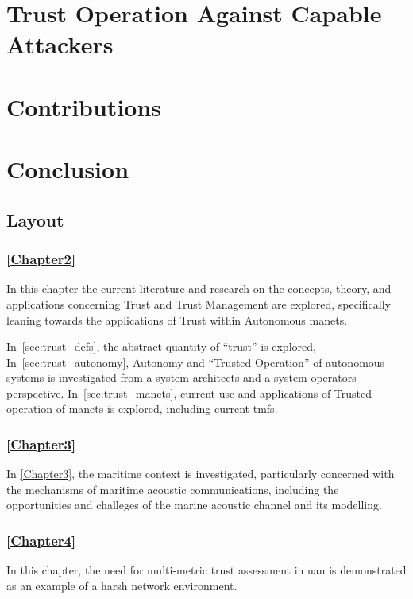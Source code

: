 \section{Trust Operation Against Capable Attackers}\label{sec:capable_attackers}


\section{Contributions}


\section{Conclusion}


\subsection{Layout}

\subsubsection{\autoref{Chapter2}}
In this chapter the current literature and research on the concepts, theory, and applications concerning Trust and Trust Management are explored, specifically leaning towards the applications of Trust within Autonomous \glspl{manet}.

In~\autoref{sec:trust_defs}, the abstract quantity of ``trust'' is explored,
In~\autoref{sec:trust_autonomy}, Autonomy and ``Trusted Operation'' of autonomous systems is investigated from a system architects and a system operators perspective.
In~\autoref{sec:trust_manets}, current use and applications of Trusted operation of \glspl{manet} is explored, including current \glspl{tmf}.

\subsubsection{\autoref{Chapter3}}
In \autoref{Chapter3}, the maritime context is investigated, particularly concerned with the mechanisms of maritime acoustic communications, including the opportunities and challeges of the marine acoustic channel and its modelling. 

\subsubsection{\autoref{Chapter4}}
In this chapter, the need for multi-metric trust assessment in \gls{uan} is demonstrated as an example of a harsh network environment.


